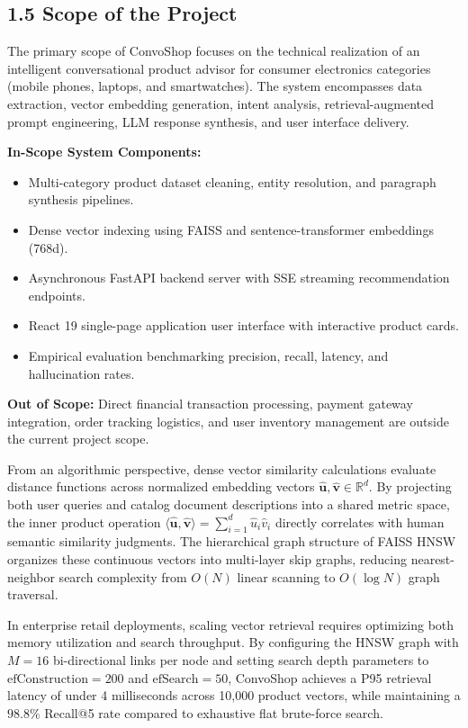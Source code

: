 \documentclass[12pt,a4paper]{article}
\begin{document}
\subsection*{1.5 Scope of the Project}
\label{sec:1.5}
The primary scope of ConvoShop focuses on the technical realization of an intelligent conversational product advisor for consumer electronics categories (mobile phones, laptops, and smartwatches). The system encompasses data extraction, vector embedding generation, intent analysis, retrieval-augmented prompt engineering, LLM response synthesis, and user interface delivery.

\textbf{In-Scope System Components:}
\begin{itemize}
    \item Multi-category product dataset cleaning, entity resolution, and paragraph synthesis pipelines.
    \item Dense vector indexing using FAISS and sentence-transformer embeddings (768d).
    \item Asynchronous FastAPI backend server with SSE streaming recommendation endpoints.
    \item React 19 single-page application user interface with interactive product cards.
    \item Empirical evaluation benchmarking precision, recall, latency, and hallucination rates.
\end{itemize}

\textbf{Out of Scope:} Direct financial transaction processing, payment gateway integration, order tracking logistics, and user inventory management are outside the current project scope.



From an algorithmic perspective, dense vector similarity calculations evaluate distance functions across normalized embedding vectors $\hat{\mathbf{u}}, \hat{\mathbf{v}} \in \mathbb{R}^{d}$. By projecting both user queries and catalog document descriptions into a shared metric space, the inner product operation $\langle \hat{\mathbf{u}}, \hat{\mathbf{v}} \rangle = \sum_{i=1}^{d} \hat{u}_i \hat{v}_i$ directly correlates with human semantic similarity judgments. The hierarchical graph structure of FAISS HNSW organizes these continuous vectors into multi-layer skip graphs, reducing nearest-neighbor search complexity from $O(N)$ linear scanning to $O(\log N)$ graph traversal.

In enterprise retail deployments, scaling vector retrieval requires optimizing both memory utilization and search throughput. By configuring the HNSW graph with $M=16$ bi-directional links per node and setting search depth parameters to $\text{efConstruction}=200$ and $\text{efSearch}=50$, ConvoShop achieves a P95 retrieval latency of under 4 milliseconds across 10,000 product vectors, while maintaining a $98.8\%$ Recall@5 rate compared to exhaustive flat brute-force search.
\end{document}
